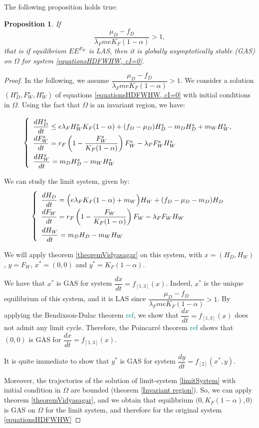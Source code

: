 \documentclass{article}
\newcommand{\lfw}{\lambda_{F}}
\newcommand{\lfw}{\lambda_{F}}
\newcommand{\marc}[1]{\textcolor{teal}{#1}}
\newtheorem{prop}{Proposition}
\begin{document}
The following proposition holds true:

\begin{prop}\label{propEEFGAS}If 
$$
\dfrac{\mu_D - f_D}{\lfw m e K_F(1-\alpha)} >1,
$$
that is if equilibrium $EE^{F_W}$ is LAS, then it is globally asymptotically stable (GAS) on $\Omega$ for system \eqref{equationsHDFWHW, cI=0}.
\end{prop}

\begin{proof}
In the following, we assume $\dfrac{\mu_D - f_D}{\lfw m e K_F(1-\alpha)} >1$. We consider a solution $(H_D^s, F_W^s, H_W^s)$ of equations \eqref{equationsHDFWHW, cI=0} with initial conditions in $\Omega$. Using the fact that $\Omega$ is an invariant region, we have:

\begin{equation}
\def\arraystretch{2}
\left\{ \begin{array}{l}
\dfrac{dH^s_D}{dt} \leq e\lfw H^s_W K_F(1-\alpha) + (f_D - \mu_D) H^s_D - m_D H^s_D + m_W H^s_W , \\
\dfrac{dF^s_W}{dt} = r_F \left(1 - \dfrac{F^s_W}{K_F(1-\alpha)} \right) F^s_W - \lfw F^s_W H^s_W \\
\dfrac{dH^s_W}{dt}= m_D H^s_D - m_W H^s_W 
\end{array} \right.
\end{equation}

We can study the limit system, given by:
\begin{equation}
\def\arraystretch{2}
\left\{ \begin{array}{l}
\dfrac{dH_D}{dt} = \Big(e\lfw K_F(1-\alpha) + m_W\Big)H_W + (f_D - \mu_D - m_D) H_D \\
\dfrac{dF_W}{dt} = r_F \left(1 - \dfrac{F_W}{K_F(1-\alpha)} \right) F_W - \lfw F_W H_W \\
\dfrac{dH_W}{dt}= m_D H_D - m_W H_W 
\end{array} \right.
\label{limitSystem}
\end{equation}

We will apply theorem \ref{theoremVidyasagar} on this system, with $x = (H_D, H_W)$, $y = F_W$, $x^* = (0,0)$ and $y^* = K_F(1- \alpha)$.

We have that $x^*$ is GAS for system $\dfrac{dx}{dt} = f_{[1,3]}(x)$. Indeed, $x^*$ is the unique equilibrium of this system, and it is LAS since $\dfrac{\mu_D - f_D}{\lfw m e K_F(1-\alpha)} >1$. By applying the Bendixson-Dulac theorem \marc{ref}, we show that $\dfrac{dx}{dt} = f_{[1,3]}(x)$ does not admit any limit cycle. Therefore, the Poincarré theorem \marc{ref} shows that $(0, 0)$ is GAS for $\dfrac{dx}{dt} = f_{[1,3]}(x)$.

It is quite immediate to show that $y^*$ is GAS for system $\dfrac{dy}{dt} = f_{[2]}(x^*, y)$. 

Moreover, the trajectories of the solution of limit-system \eqref{limitSystem} with initial condition in $\Omega$ are bounded (theorem \ref{Invariant region}). So, we can apply theorem \ref{theoremVidyasagar}, and we obtain that equilibrium $\Big(0, K_F(1-\alpha), 0 \Big)$ is GAS on $\Omega$ for the limit system, and therefore for the original system \eqref{equationsHDFWHW}
\end{proof}
\end{document}
